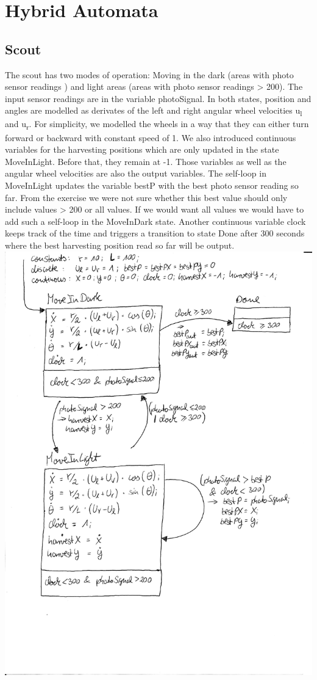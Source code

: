 \documentclass[12pt]{article}
\begin{document}
\section*{Hybrid Automata}
\subsection* {Scout}
The scout has two modes of operation: Moving in the dark (areas with photo sensor readings ) and light areas (areas with photo sensor readings > 200). The input sensor readings are in the variable photoSignal. In both states, position and angles are modelled as derivates of the left and right angular wheel velocities u\textsubscript{l} and u\textsubscript{r}. For simplicity, we modelled the wheels in a way that they can either turn forward or backward with constant speed of 1. We also introduced continuous variables for the harvesting positions which are only updated in the state MoveInLight. Before that, they remain at -1. Those variables as well as the angular wheel velocities are also the output variables. The self-loop in MoveInLight updates the variable bestP with the best photo sensor reading so far. From the exercise we were not sure whether this best value should only include values > 200 or all values. If we would want all values we would have to add such a self-loop in the MoveInDark state. Another continuous variable clock keeps track of the time and triggers a transition to state Done after 300 seconds where the best harvesting position read so far will be output.\\
\includegraphics[scale = 0.8]{pictures/hybrid_automata_scout}
\end{document}
